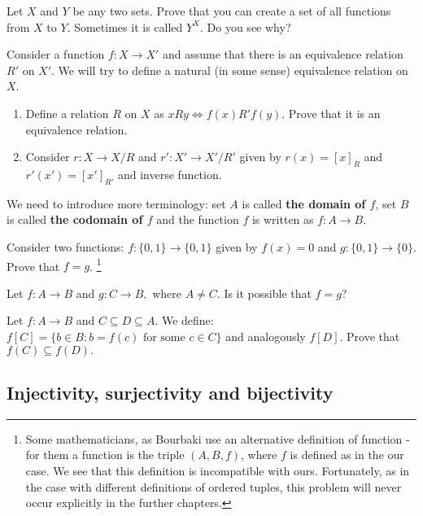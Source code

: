 \begin{exercise}
  Let $X$ and $Y$ be any two sets. Prove that you can create a set of all functions from $X$ to $Y$. Sometimes it is called $Y^X$. Do you see why?
\end{exercise}

\begin{exercise}
  Consider a function $f: X\to X'$ and assume that there is an equivalence relation $R'$ on $X'$. We will try to define a natural (in some sense) equivalence relation on $X$.
  \begin{enumerate}
    \item Define a relation $R$ on $X$ as $xRy\Leftrightarrow f(x) R' f(y)$. Prove that it is an equivalence relation.
    \item Consider $r: X\to X/R$ and $r': X'\to X'/R'$ given by $r(x)=[x]_R$ and $r'(x')=[x']_{R'}$ and inverse function.
  \end{enumerate}
\end{exercise}

We need to introduce more terminology: set $A$ is called \textbf{the domain of $f$}, set $B$ is called
\textbf{the codomain of $f$} and the function $f$ is written as $f: A\to B$.

\begin{prob}
	Consider two functions: $f:\{0, 1\}\to \{0,1\}$ given by $f(x)=0$ and $g:\{0,1\}\to\{0\}$.
	Prove that $f=g$.
	\footnote{Some mathematicians, as Bourbaki use an alternative definition of function - for them
	a function is the triple $(A,B,f)$, where $f$ is defined as in the our case. We see that this definition
	is incompatible with ours. Fortunately, as in the case with different definitions of ordered tuples,
	this problem will never occur explicitly in the further chapters.}
\end{prob}

\begin{prob}
	Let $f:A\to B$ and $g: C\to B,$ where $A\neq C$. Is it possible that $f=g$?
\end{prob}

\begin{prob}
	Let $f: A\to B$ and $C\subseteq D\subseteq A$. We define: $f[C] = \{b\in B : b=f(c) \text{ for some }c\in C \}$ and analogously $f[D]$. Prove that
	$f(C)\subseteq f(D).$
\end{prob}

\subsection{Injectivity, surjectivity and bijectivity}

